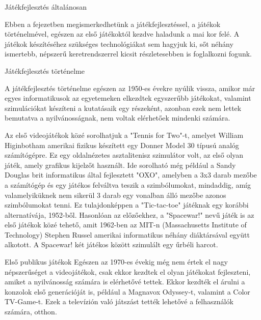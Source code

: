 \begin{MyChapter}{Játékfejlesztés általánosan}
	
	Ebben a fejezetben megismerkedhetünk a játékfejlesztéssel, a játékok történelmével, egészen az első játékoktól kezdve haladunk a mai kor felé. A játékok készítéséhez szükséges technológiákat sem hagyjuk ki, sőt néhány ismertebb, népszerű keretrendszerrel kicsit részletesebben is foglalkozni fogunk.

	\begin{MySection}{Játékfejlesztés történelme}
		
		A játékfejlesztés történelme egészen az 1950-es évekre nyúlik vissza, amikor már egyes informatikusok az egyetemeken elkezdtek egyszerűbb játékokat, valamint szimulációkat készíteni a kutatásaik egy részeként, azonban ezek nem lettek bemutatva a nyilvánosságnak, nem voltak elérhetőek mindenki számára.  \cite{video_game_development}
		
		Az első videojátékok közé sorolhatjuk a "Tennis for Two"-t, amelyet William Higinbotham amerikai fizikus készített egy Donner Model 30 típusú analóg számítógépre. Ez egy oldalnézetes asztalitenisz szimulátor volt, az első olyan játék, amely grafikus kijelzőt használt.
		Ide sorolható még például a Sandy Douglas brit informatikus által fejlesztett "OXO", amelyben a 3x3 darab mezőbe a számítógép és egy játékos felváltva teszik a szimbólumokat, mindaddig, amíg valamelyiküknek nem sikerül 3 darab egy vonalban álló mezőbe azonos szimbólumokat tenni. Ez tulajdonképpen a "Tic-tac-toe" játéknak egy korábbi alternatívája, 1952-ből.
		Hasonlóan az előzőekhez, a "Spacewar!" nevű játék is az első játékok közé tehető, amit 1962-ben az MIT-n (Massachusetts Institute of Technology) Stephen Russel amerikai informatikus néhány diáktársával együtt alkotott. A Spacewar! két játékos között szimulált egy űrbéli harcot. 
		
		
		\begin{MySubSection}{Első publikus játékok}
		Egészen az 1970-es évekig még nem értek el nagy népszerűséget a videojátékok, csak ekkor kezdtek el olyan játékokat fejleszteni, amiket a nyilvánosság számára is elérhetővé tettek. Ekkor kezdték el árulni a konzolok első generációját is, például a Magnavox Odyssey-t, valamint a Color TV-Game-t. Ezek a televízión való játszást tették lehetővé a felhasználók számára, otthon.
		

\end{MySubSection}
\end{MySection}
\end{MyChapter}
